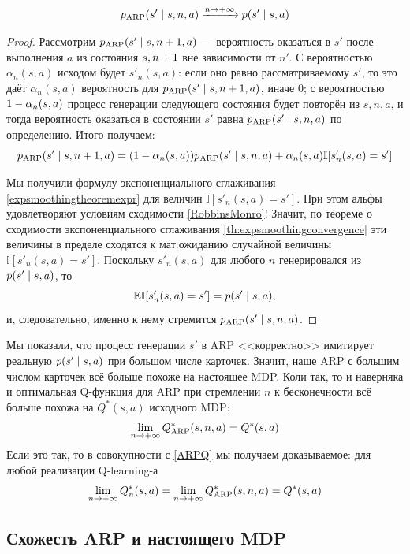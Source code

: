 \begin{theorem}\,
\begin{equation}\label{arptranslimit}
p_{\mathrm{ARP}}(s' \mid s, n, a) \xrightarrow{ n \to +\infty } p(s' \mid s, a)
\end{equation}
\begin{proof}
Рассмотрим $p_{\ARP}(s' \HM\mid s, n \HM+ 1, a)$ --- вероятность оказаться в $s'$ после выполнения $a$ из состояния $s, n \HM+ 1$ вне зависимости от $n'$. С вероятностью $\alpha_{n}(s, a)$ исходом будет $s'_n(s, a)$: если оно равно рассматриваемому $s'$, то это даёт $\alpha_n(s, a)$ вероятность для $p_{\ARP}(s' \mid s, n \HM+ 1, a)$, иначе 0; с вероятностью $1 \HM- \alpha_{n}(s, a)$ процесс генерации следующего состояния будет повторён из $s, n, a$, и тогда вероятность оказаться в состоянии $s'$ равна $p_{\ARP}(s' \HM\mid s, n, a)$ по определению. Итого получаем:
$$p_{\mathrm{ARP}}(s' \mid s, n + 1, a) = (1 - \alpha_{n}(s, a))p_{\mathrm{ARP}}(s' \mid s, n, a) + \alpha_{n}(s, a) \mathbb{I}[s'_n(s, a) = s']$$

Мы получили формулу экспоненциального сглаживания \eqref{expsmoothingtheoremexpr} для величин $\mathbb{I}[s'_n(s, a) = s']$. При этом альфы удовлетворяют условиям сходимости \eqref{RobbinsMonro}! Значит, по теореме о сходимости экспоненциального сглаживания \ref{th:expsmoothingconvergence} эти величины в пределе сходятся к мат.ожиданию случайной величины $\mathbb{I}[s'_n(s, a) = s']$. Поскольку $s'_n(s, a)$ для любого $n$ генерировался из $p(s' \HM\mid s, a)$, то 
$$\E \mathbb{I}[s'_n(s, a) = s'] \HM= p(s' \HM\mid s, a),$$
и, следовательно, именно к нему стремится $p_{\ARP}(s' \HM\mid s, n, a)$.
\end{proof}
\end{theorem}

Мы показали, что процесс генерации $s'$ в ARP <<корректно>> имитирует реальную $p(s' \HM\mid s, a)$ при большом числе карточек. Значит, наше ARP с большим числом карточек всё больше похоже на настоящее MDP. Коли так, то и наверняка и оптимальная Q-функция для ARP при стремлении $n$ к бесконечности всё больше похожа на $Q^*(s, a)$ исходного MDP:
$$\lim_{n \to +\infty} Q_{\mathrm{ARP}}^*(s, n, a) = Q^*(s, a)$$
Если это так, то в совокупности с \eqref{ARPQ} мы получаем доказываемое: для любой реализации Q-learning-а 
$$\lim_{n \to +\infty} Q_n^*(s, a) = \lim_{n \to +\infty} Q_{\mathrm{ARP}}^*(s, n, a) = Q^*(s, a)$$

\subsection{Схожесть ARP и настоящего MDP}

